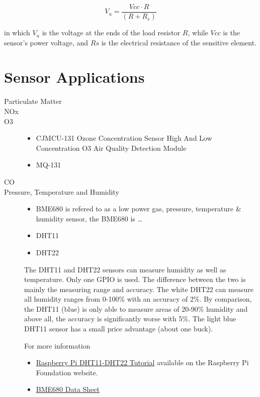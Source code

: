 \documentclass{article}\usepackage[]{graphicx}\usepackage[]{color}
\begin{document}
\begin{equation} 
V_u = \frac{Vcc \cdot R}{(R+R_s)}
\end{equation}
 
in which $V_u$ is the voltage at the ends of the load resistor $R$, while $Vcc$ is the sensor's power voltage, and $Rs$ is the electrical resistance of the sensitive element.

\section{Sensor Applications}

\begin{description}

\item[Particulate Matter]

\item[NOx]

\item[O3]

\begin{itemize}
  \item CJMCU-131 Ozone Concentration Sensor High And Low Concentration O3 Air Quality Detection Module
  \item MQ-131
\end{itemize}

\item[CO]

\item[Pressure, Temperature and Humidity]


\begin{itemize}
  \item BME680 is refered to as a low power gas, pressure, temperature \& humidity sensor, the BME680 is \ldots
  \item DHT11
  \item DHT22
\end{itemize}

The DHT11 and DHT22 sensors can measure humidity as well as temperature. Only one GPIO is used. The difference between the two is mainly the measuring range and accuracy. The white DHT22 can measure all humidity ranges from 0-100\% with an accuracy of 2\%. By comparison, the DHT11 (blue) is only able to measure areas of 20-90\% humidity and above all, the accuracy is significantly worse with 5\%. The light blue DHT11 sensor has a small price advantage (about one buck).

For more information

\begin{itemize}
  \item \href{https://tutorials-raspberrypi.com/raspberry-pi-measure-humidity-temperature-dht11-dht22/}{Raspberry Pi DHT11-DHT22 Tutorial} available on the Raspberry Pi Foundation website.
  \item \href{https://cdn-shop.adafruit.com/product-files/3660/BME680.pdf}{BME680 Data Sheet}
\end{itemize}


\end{description}
\end{document}
